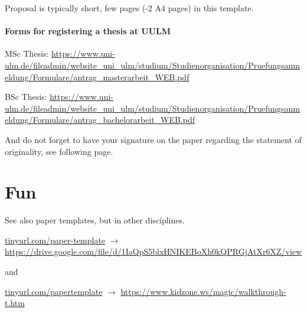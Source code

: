 \documentclass[sigconf, nonacm]{acmart}
\begin{document}
Proposal is typically short, few pages (-2 A4 pages) in this template.

\paragraph{Forms for registering a thesis at UULM}

MSc Thesis:
\url{https://www.uni-ulm.de/fileadmin/website_uni_ulm/studium/Studienorganisation/Pruefungsanmeldung/Formulare/antrag_masterarbeit_WEB.pdf}

BSc Thesis:
\url{https://www.uni-ulm.de/fileadmin/website_uni_ulm/studium/Studienorganisation/Pruefungsanmeldung/Formulare/antrag_bachelorarbeit_WEB.pdf}

And do not forget to have your signature on the paper regarding the statement of originality, see following page.

\newpage

\section*{Fun}

See also paper templates, but in other disciplines.

\url{tinyurl.com/paper-template}
$\rightarrow$ 
\url{https://drive.google.com/file/d/1IaQpS5blxHNIKEBoXh0kQPRGjAtXr6XZ/view}

and

\url{tinyurl.com/papertemplate}
$\rightarrow$ 
\url{https://www.kidzone.ws/magic/walkthrough-t.htm}

\newpage
\onecolumn


\newpage

\end{document}
